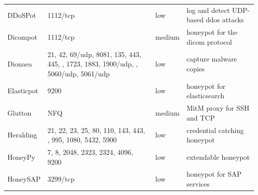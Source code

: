 \begin{table}
\begin{tabularx}{\linewidth}{l|XlX}
        DDoSPot \cite{ddosspot2021}               & 1112/tcp                                                                                                    & low                        & log and detect UDP-based \ac{ddos} attacks                                           \\
        Dicompot \cite{dicompot2021}              & 1112/tcp                                                                                                    & medium                     & honeypot for the \ac{dicom} protocol                                                 \\
        Dionaea \cite{dionaea2021}                & 21, 42, 69/udp, 8081, 135, 443, 445, \newline 1433, 1723, 1883, 1900/udp, \newline 3306, 5060/udp, 5061/udp & low                        & capture malware copies                                                               \\
        Elasticpot \cite{elasticpot2021}          & 9200                                                                                                        & low                        & honeypot for elasticsearch                                                           \\
        Glutton \cite{glutton2021}                & NFQ                                                                                                         & medium                     & MitM proxy for SSH and TCP                                                           \\
        Heralding \cite{heralding2021}            & 21, 22, 23, 25, 80, 110, 143, 443, \newline 993, 995, 1080, 5432, 5900                                      & low                        & credential catching honeypot                                                         \\
        HoneyPy \cite{honeysap2021}               & 7, 8, 2048, 2323, 2324, 4096, 9200                                                                          & low                        & extendable honeypot                                                                  \\
        HoneySAP \cite{honeysap2021}              & 3299/tcp                                                                                                    & low                        & honeypot for SAP services                                                            \\

\end{tabularx}
\end{table}
